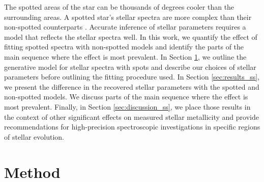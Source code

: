 The spotted areas of the star can be thousands of degrees cooler than the surrounding areas. A spotted star's stellar spectra are more complex than their non-spotted counterparts \citep{morris_stellar_2019}. Accurate inference of stellar parameters requires a model that reflects the stellar spectra well. In this work, we quantify the effect of fitting spotted spectra with non-spotted models and identify the parts of the main sequence where the effect is most prevalent.
In Section \ref{sec:methods_ss}, we outline the generative model for stellar spectra with spots and describe our choices of stellar parameters before outlining the fitting procedure used.
In Section \ref{sec:results_ss}, we present the difference in the recovered stellar parameters with the spotted and non-spotted models. We discuss parts of the main sequence where the effect is most prevalent. Finally, in Section \ref{sec:discussion_ss}, we place those results in the context of other significant effects on measured stellar metallicity and provide recommendations for high-precision spectroscopic investigations in specific regions of stellar evolution.

\section{Method}
\label{sec:methods_ss}


